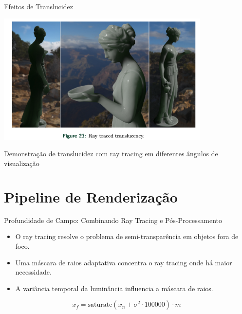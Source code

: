 \documentclass[aspectratio=169,xcolor=table]{beamer}
\begin{document}
\begin{frame}{Efeitos de Translucidez}
    \begin{center}
        \includegraphics[width=0.8\textwidth]{ray-traced-translucency}
    \end{center}
    \begin{center}
        \small{Demonstração de translucidez com ray tracing em diferentes ângulos de visualização}
    \end{center}
\end{frame}

\section{Pipeline de Renderização}
\begin{frame}{Profundidade de Campo: Combinando Ray Tracing e Pós-Processamento}
    \begin{itemize}
        \item O ray tracing resolve o problema de semi-transparência em objetos fora de foco.
        \item Uma máscara de raios adaptativa concentra o ray tracing onde há maior necessidade.
        \item A variância temporal da luminância influencia a máscara de raios.
    \end{itemize}
    \begin{equation*}
        x_f = \text{saturate}(x_n + \sigma^2 \cdot 100000) \cdot m
    \end{equation*}
\end{frame}
\end{document}

